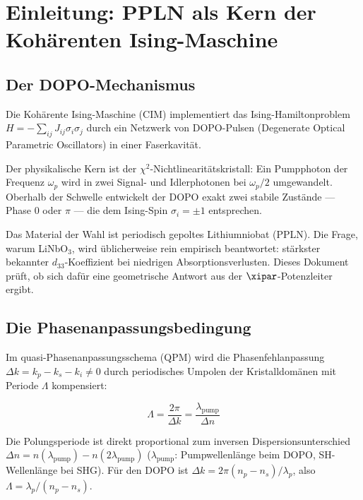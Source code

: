 \clearpage

\section{Einleitung: PPLN als Kern der Kohärenten Ising-Maschine}
\label{sec:intro}

\subsection{Der DOPO-Mechanismus}

Die Kohärente Ising-Maschine (CIM) implementiert das Ising-Hamiltonproblem
$H = -\sum_{ij} J_{ij}\sigma_i\sigma_j$ durch ein Netzwerk von DOPO-Pulsen
(Degenerate Optical Parametric Oscillators) in einer Faserkavität.

Der physikalische Kern ist der $\chi^2$-Nichtlinearitätskristall: Ein Pumpphoton
der Frequenz $\omega_p$ wird in zwei Signal- und Idlerphotonen bei $\omega_p/2$
umgewandelt. Oberhalb der Schwelle entwickelt der DOPO exakt zwei stabile
Zustände — Phase 0 oder $\pi$ — die dem Ising-Spin $\sigma_i = \pm 1$
entsprechen.

Das Material der Wahl ist periodisch gepoltes Lithiumniobat (PPLN). Die Frage,
warum LiNbO$_3$, wird üblicherweise rein empirisch beantwortet: stärkster
bekannter $d_{33}$-Koeffizient bei niedrigen Absorptionsverlusten.
Dieses Dokument prüft, ob sich dafür eine geometrische Antwort aus der
$\xipar$-Potenzleiter ergibt.

\subsection{Die Phasenanpassungsbedingung}

Im quasi-Phasenanpassungsschema (QPM) wird die Phasenfehlanpassung
$\Delta k = k_p - k_s - k_i \neq 0$ durch periodisches Umpolen der
Kristalldomänen mit Periode $\Lambda$ kompensiert:

\begin{equation}
    \Lambda = \frac{2\pi}{\Delta k} = \frac{\lambda_{\text{pump}}}{\Delta n}
    \label{eq:poling}
\end{equation}

Die Polungsperiode ist direkt proportional zum inversen
Dispersionsunterschied $\Delta n = n(\lambda_{\text{pump}}) -
n(2\lambda_{\text{pump}})$ ($\lambda_{\text{pump}}$: Pumpwellenlänge beim DOPO, SH-Wellenlänge bei SHG).
Für den DOPO ist $\Delta k = 2\pi(n_p - n_s)/\lambda_p$, also $\Lambda = \lambda_p/(n_p - n_s)$.

